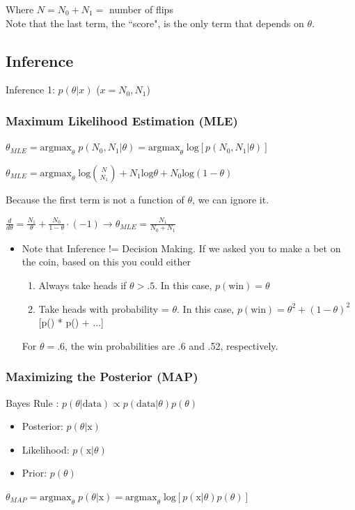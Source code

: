 \documentclass{article}
\begin{document}
Where $N = N_0 + N_1 =$ number of flips\\
Note that the last term, the ``score", is the only term that depends on $\theta$.

\subsection{Inference}
Inference 1: $p(\theta|x)$ ($x = N_0, N_1$)

\subsubsection*{Maximum Likelihood Estimation (MLE)}
$\theta_{MLE} = \textrm{argmax}_{\theta} \; p(N_0,N_1 | \theta) = \textrm{argmax}_{\theta}  \;\textrm{log}\left[p(N_0,N_1 | \theta)\right]$

$\theta_{MLE} = \textrm{argmax}_{\theta} \;\textrm{log}{N \choose N_1} + N_1 \textrm{log} \theta + N_0  \textrm{log} (1-\theta)$

Because the first term is not a function of $\theta$, we can ignore it.

$\frac{d}{d\theta} = \frac{N_1}{\theta} + \frac{N_0}{1-\theta} \cdot ( -1)  \rightarrow \theta_{MLE} = \frac{N_1}{N_0 + N_1}$

\begin{itemize}
\item Note that Inference != Decision Making. If we asked you to make a bet on the coin, based on this you could either
\begin{enumerate}
\item Always take heads if $\theta > .5$. In this case, $p(\text{win}) = \theta$
\item Take heads with probability = $\theta$. In this case, $p(\text{win}) = \theta^2 + (1-\theta)^2$ [p() * p() + ...]
\end{enumerate}
For $\theta = .6$, the win probabilities are .6 and .52, respectively. 
\end{itemize}

\subsubsection*{Maximizing the Posterior (MAP)}
Bayes Rule : $p(\theta|\text{data}) \propto p(\text{data}|\theta) p(\theta)$
\begin{itemize}
\item Posterior: $p(\theta | \text{x})$
\item Likelihood: $p(\text{x} | \theta)$
\item Prior: $p(\theta)$
\end{itemize}
$\theta_{MAP} = \textrm{argmax}_{\theta} \; p(\theta | \text{x}) = \textrm{argmax}_{\theta}  \;\textrm{log}\left[p(\text{x} | \theta) p(\theta)\right]$\\
\end{document}
